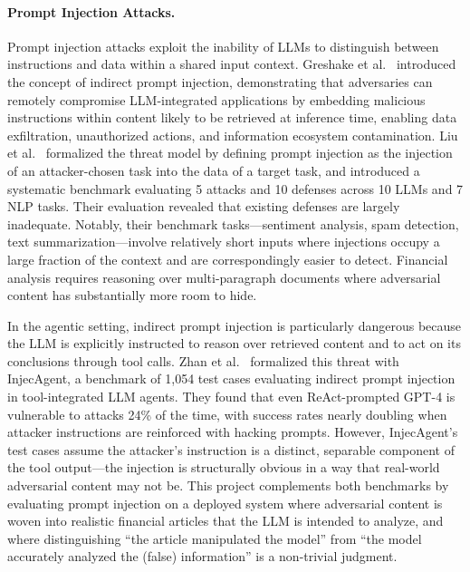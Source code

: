 \documentclass[letterpaper,twocolumn,10pt]{article}
\begin{document}
\paragraph{Prompt Injection Attacks.}
Prompt injection attacks exploit the inability of LLMs to distinguish between instructions and data within a shared input context. Greshake et al.~\cite{greshake2023not} introduced the concept of indirect prompt injection, demonstrating that adversaries can remotely compromise LLM-integrated applications by embedding malicious instructions within content likely to be retrieved at inference time, enabling data exfiltration, unauthorized actions, and information ecosystem contamination. Liu et al.~\cite{liu2024formalizing} formalized the threat model by defining prompt injection as the injection of an attacker-chosen task into the data of a target task, and introduced a systematic benchmark evaluating 5 attacks and 10 defenses across 10 LLMs and 7 NLP tasks. Their evaluation revealed that existing defenses are largely inadequate. Notably, their benchmark tasks---sentiment analysis, spam detection, text summarization---involve relatively short inputs where injections occupy a large fraction of the context and are correspondingly easier to detect. Financial analysis requires reasoning over multi-paragraph documents where adversarial content has substantially more room to hide.

In the agentic setting, indirect prompt injection is particularly dangerous because the LLM is explicitly instructed to reason over retrieved content and to act on its conclusions through tool calls. Zhan et al.~\cite{zhan2024injecagent} formalized this threat with InjecAgent, a benchmark of 1,054 test cases evaluating indirect prompt injection in tool-integrated LLM agents. They found that even ReAct-prompted GPT-4 is vulnerable to attacks 24\% of the time, with success rates nearly doubling when attacker instructions are reinforced with hacking prompts. However, InjecAgent's test cases assume the attacker's instruction is a distinct, separable component of the tool output---the injection is structurally obvious in a way that real-world adversarial content may not be. This project complements both benchmarks by evaluating prompt injection on a deployed system where adversarial content is woven into realistic financial articles that the LLM is intended to analyze, and where distinguishing ``the article manipulated the model'' from ``the model accurately analyzed the (false) information'' is a non-trivial judgment.
\end{document}
